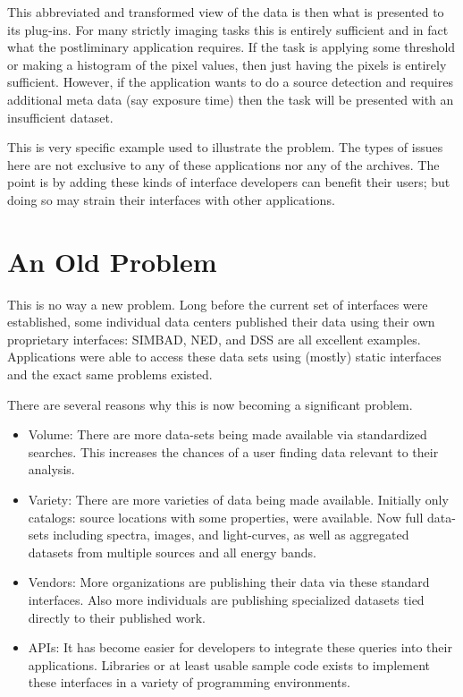 This abbreviated and transformed view of the data is then what is presented to its plug-ins.  For many strictly imaging tasks this is entirely sufficient and in fact what the postliminary application requires.  If the task is applying some threshold or making a histogram of the pixel values, then just having the pixels is entirely sufficient. However, if the application wants to do a source detection and requires additional meta data (say exposure time) then the task will be presented with an insufficient dataset.

This is very specific example used to illustrate the problem.  The types of issues here are not exclusive to any of these applications nor any of the archives.  The point is by adding these kinds of  interface developers can benefit their users; but doing so may strain their interfaces with other applications.

\section{An Old Problem}

This is no way a new problem.  Long before the current set of interfaces were established, some individual data centers published their data using their own proprietary interfaces:  SIMBAD, NED, and DSS are all excellent examples. Applications were able to access these data sets using (mostly) static interfaces and the exact same problems existed.

There are several reasons why this is now becoming a significant problem.

\begin{itemize}

\item Volume: There are more data-sets being made available via standardized searches. This increases the chances of a user finding data relevant to their analysis. 
\item Variety:  There are more varieties of data being made available.  Initially only catalogs: source locations with some properties, were available.  Now full data-sets including spectra, images, and light-curves, as well as aggregated datasets from multiple sources and all energy bands.
\item Vendors: More organizations are publishing their data via these standard interfaces.  Also more individuals are publishing specialized datasets tied directly to their published work.
\item APIs: It has become easier for developers to integrate these queries into their applications.  Libraries or at least usable sample code exists to implement these interfaces in a variety of programming environments.

\end{itemize}

